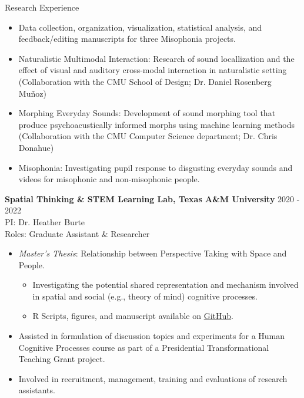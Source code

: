 \documentclass{resume} %
\begin{document}
\begin{rSection}{Research Experience}
\begin{itemize}[nosep]
		\item Data collection, organization, visualization, statistical analysis, and feedback/editing manuscripts for three Misophonia projects.
		\item Naturalistic Multimodal Interaction: Research of sound locallization and the effect of visual and auditory cross-modal interaction in naturalistic setting (Collaboration with the CMU School of Design; Dr. Daniel Rosenberg Muñoz)
		\item Morphing Everyday Sounds: Development of sound morphing tool that produce psychoacustically informed morphs using machine learning methods (Collaboration with the CMU Computer Science department; Dr. Chris Donahue)
		\item Misophonia: Investigating pupil response to disgusting everyday sounds and videos for misophonic and non-misophonic people.
		
	\end{itemize}
    
    {\bf Spatial Thinking \& STEM Learning Lab, 
        Texas A\&M University}
    \hfill { 2020 - 2022}
    \\PI: Dr. Heather Burte
    \\Roles: Graduate Assistant \& Researcher
    
    \begin{itemize}[nosep]
        
        \item \emph{Master's Thesis}: Relationship between Perspective Taking 
        with Space and People.
            \begin{itemize}
                \item Investigating the potential shared representation and mechanism involved in spatial and social (e.g., theory of mind) cognitive processes.
                \item R Scripts, figures, and manuscript available on \href{https://github.com/sjp117/spatialSocialPerspectiveTaking}{GitHub}.
            \end{itemize}
        \item Assisted in formulation of discussion topics and experiments for 
        a Human Cognitive Processes course as part of a Presidential 
        Transformational Teaching Grant project.
        \item Involved in recruitment, management, training and evaluations of research assistants.
        

\end{itemize}
\end{rSection}
\end{document}
